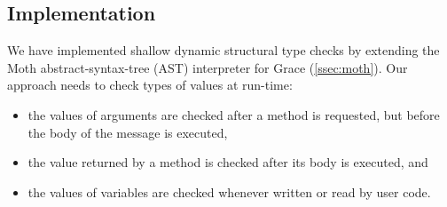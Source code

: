 
\subsection{Implementation} 
\label{ssec:implementation} 


We have implemented shallow dynamic structural type checks 
by extending the Moth abstract-syntax-tree (AST) interpreter for
Grace (\cref{ssec:moth}).
%
%
%
%
Our approach needs to check types of values at run-time:

\begin{itemize}
\item the values of arguments are checked after a method is requested, 
      but before the body of the message is executed,
\item the value returned by a method is checked after its body is executed, and
\item the values of variables are checked
      whenever written or read by user code.
\end{itemize}

